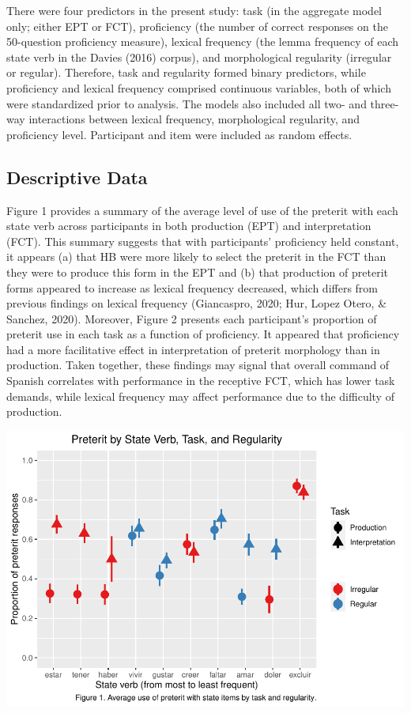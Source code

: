 \documentclass[
  english,
  man]{apa6}
\begin{document}
There were four predictors in the present study: task (in the aggregate model only; either EPT or FCT), proficiency (the number of correct responses on the 50-question proficiency measure), lexical frequency (the lemma frequency of each state verb in the Davies (2016) corpus), and morphological regularity (irregular or regular). Therefore, task and regularity formed binary predictors, while proficiency and lexical frequency comprised continuous variables, both of which were standardized prior to analysis. The models also included all two- and three-way interactions between lexical frequency, morphological regularity, and proficiency level. Participant and item were included as random effects.

\hypertarget{descriptive-data}{%
\subsection{Descriptive Data}\label{descriptive-data}}

Figure 1 provides a summary of the average level of use of the preterit with each state verb across participants in both production (EPT) and interpretation (FCT). This summary suggests that with participants' proficiency held constant, it appears (a) that HB were more likely to select the preterit in the FCT than they were to produce this form in the EPT and (b) that production of preterit forms appeared to increase as lexical frequency decreased, which differs from previous findings on lexical frequency (Giancaspro, 2020; Hur, Lopez Otero, \& Sanchez, 2020). Moreover, Figure 2 presents each participant's proportion of preterit use in each task as a function of proficiency. It appeared that proficiency had a more facilitative effect in interpretation of preterit morphology than in production. Taken together, these findings may signal that overall command of Spanish correlates with performance in the receptive FCT, which has lower task demands, while lexical frequency may affect performance due to the difficulty of production.

\includegraphics{Manuscript_files/figure-latex/Pret-LI-graph-1.pdf}
\end{document}
